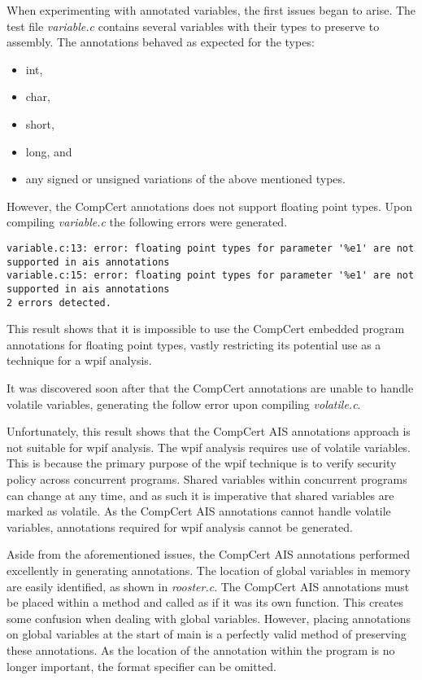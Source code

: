 When experimenting with annotated variables, the first issues began to arise. The test file \textit{variable.c} contains several variables with their types to preserve to assembly. The annotations behaved as expected for the types:

\begin{itemize}
    \item int,
    \item char,
    \item short, 
    \item long, and
    \item any signed or unsigned variations of the above mentioned types.
\end{itemize}

However, the CompCert annotations does not support floating point types. Upon compiling \textit{variable.c} the following errors were generated.

\begin{lstlisting}[numbers=none]
variable.c:13: error: floating point types for parameter '%e1' are not supported in ais annotations
variable.c:15: error: floating point types for parameter '%e1' are not supported in ais annotations
2 errors detected.
\end{lstlisting}

This result shows that it is impossible to use the CompCert embedded program annotations for floating point types, vastly restricting its potential use as a technique for a wpif analysis.

It was discovered soon after that the CompCert annotations are unable to handle volatile variables, generating the follow error upon compiling \textit{volatile.c}.



Unfortunately, this result shows that the CompCert AIS annotations approach is not suitable for wpif analysis. The wpif analysis requires use of volatile variables. This is because the primary purpose of the wpif technique is to verify security policy across concurrent programs. Shared variables within concurrent programs can change at any time, and as such it is imperative that shared variables are marked as volatile. As the CompCert AIS annotations cannot handle volatile variables, annotations required for wpif analysis cannot be generated.

Aside from the aforementioned issues, the CompCert AIS annotations performed excellently in generating annotations. The location of global variables in memory are easily identified, as shown in \textit{rooster.c}. The CompCert AIS annotations must be placed within a method and called as if it was its own function. This creates some confusion when dealing with global variables. However, placing annotations on global variables at the start of main is a perfectly valid method of preserving these annotations. As the location of the annotation within the program is no longer important, the  format specifier can be omitted.

